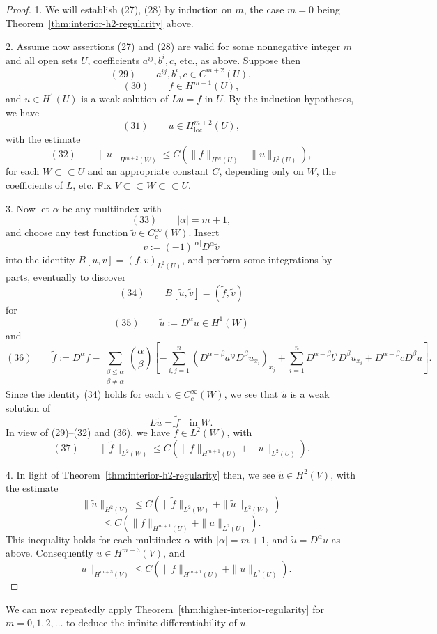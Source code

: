 \begin{proof}
1. We will establish (27), (28) by induction on $m$, the case $m=0$ being Theorem~\ref{thm:interior-h2-regularity} above.

2. Assume now assertions (27) and (28) are valid for some nonnegative integer $m$ and all open sets $U$, coefficients $a^{ij}, b^i, c$, etc., as above. Suppose then
$$(29) \qquad a^{ij}, b^i, c \in C^{m+2}(U),$$
$$(30) \qquad f \in H^{m+1}(U),$$
and $u \in H^1(U)$ is a weak solution of $Lu = f$ in $U$. By the induction hypotheses, we have
$$(31) \qquad u \in H^{m+2}_{\text{loc}}(U),$$
with the estimate
$$(32) \qquad \|u\|_{H^{m+2}(W)} \leq C(\|f\|_{H^m(U)}+\|u\|_{L^2(U)}),$$
for each $W \subset\subset U$ and an appropriate constant $C$, depending only on $W$, the coefficients of $L$, etc. Fix $V \subset\subset W \subset\subset U$.

3. Now let $\alpha$ be any multiindex with
$$(33) \qquad |\alpha| = m+1,$$
and choose any test function $\tilde v \in C_c^\infty(W)$. Insert
$$v := (-1)^{|\alpha|}D^\alpha\tilde v$$
into the identity $B[u,v] = (f,v)_{L^2(U)}$, and perform some integrations by parts, eventually to discover
$$(34) \qquad B[\tilde u,\tilde v] = (\tilde f,\tilde v)$$
for
$$(35) \qquad \tilde u := D^\alpha u \in H^1(W)$$
and
$$(36) \qquad \tilde f := D^\alpha f - \sum_{\substack{\beta \leq \alpha \\ \beta \neq \alpha}}\binom\alpha\beta\left[-\sum_{i,j=1}^n(D^{\alpha-\beta}a^{ij}D^\beta u_{x_i})_{x_j} + \sum_{i=1}^n D^{\alpha-\beta}b^iD^\beta u_{x_i} + D^{\alpha-\beta}cD^\beta u\right].$$
Since the identity (34) holds for each $\tilde v \in C_c^\infty(W)$, we see that $\tilde u$ is a weak solution of
$$L\tilde u = \tilde f \quad \text{in } W.$$
In view of (29)--(32) and (36), we have $\tilde f \in L^2(W)$, with
$$(37) \qquad \|\tilde f\|_{L^2(W)} \leq C(\|f\|_{H^{m+1}(U)}+\|u\|_{L^2(U)}).$$

4. In light of Theorem~\ref{thm:interior-h2-regularity} then, we see $\tilde u \in H^2(V)$, with the estimate
$$\|\tilde u\|_{H^2(V)} \leq C(\|\tilde f\|_{L^2(W)}+\|\tilde u\|_{L^2(W)})$$
$$\leq C(\|f\|_{H^{m+1}(U)}+\|u\|_{L^2(U)}).$$
This inequality holds for each multiindex $\alpha$ with $|\alpha| = m+1$, and $\tilde u = D^\alpha u$ as above. Consequently $u \in H^{m+3}(V)$, and
$$\|u\|_{H^{m+3}(V)} \leq C(\|f\|_{H^{m+1}(U)}+\|u\|_{L^2(U)}).$$
\end{proof}

We can now repeatedly apply Theorem~\ref{thm:higher-interior-regularity} for $m = 0,1,2,\ldots$ to deduce the infinite differentiability of $u$.

